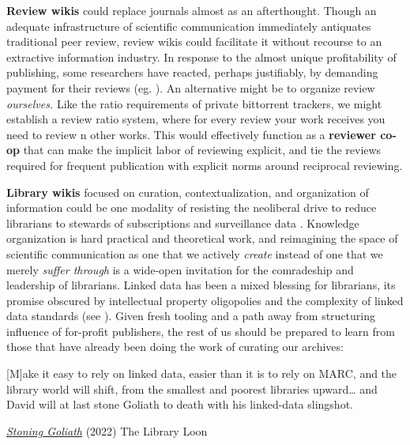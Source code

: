 \textbf{Review wikis} could replace journals almost as an afterthought.
Though an adequate infrastructure of scientific communication
immediately antiquates traditional peer review, review wikis could
facilitate it without recourse to an extractive information industry. In
response to the almost unique profitability of publishing, some
researchers have reacted, perhaps justifiably, by demanding payment for
their reviews (eg. \citep{heathers450Movement2020} ). An
alternative might be to organize review \emph{ourselves.} Like the ratio
requirements of private bittorrent trackers, we might establish a review
ratio system, where for every review your work receives you need to
review n other works. This would effectively function as a
\textbf{reviewer co-op} that can make the implicit labor of reviewing
explicit, and tie the reviews required for frequent publication with
explicit norms around reciprocal reviewing.

\textbf{Library wikis} focused on curation, contextualization, and
organization of information could be one modality of resisting the
neoliberal drive to reduce librarians to stewards of subscriptions and
surveillance data \citep{lamdanLibrarianshipCrossroadsICE2019, quinnResistingNeoliberalismChallenge2017} . Knowledge organization is
hard practical and theoretical work, and reimagining the space of
scientific communication as one that we actively \emph{create} instead
of one that we merely \emph{suffer through} is a wide-open invitation
for the comradeship and leadership of librarians. Linked data has been a
mixed blessing for librarians, its promise obscured by intellectual
property oligopolies and the complexity of linked data standards (see
\citep{librariaStoningGoliath2022} ). Given fresh tooling and a
path away from structuring influence of for-profit publishers, the rest
of us should be prepared to learn from those that have already been
doing the work of curating our archives:

\begin{leftbar}
{[}M{]}ake it easy to rely on linked data, easier than it is to rely on
MARC, and the library world will shift, from the smallest and poorest
libraries upward\ldots{} and David will at last stone Goliath to death
with his linked-data slingshot.

\href{https://gavialib.com/2022/06/stoning-goliath/}{\emph{Stoning
Goliath}} (2022) The Library Loon \citep{librariaStoningGoliath2022} 
\end{leftbar}

